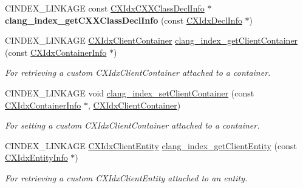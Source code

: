 \begin{DoxyCompactItemize}
C\+I\+N\+D\+E\+X\+\_\+\+L\+I\+N\+K\+A\+GE const \mbox{\hyperlink{structCXIdxCXXClassDeclInfo}{C\+X\+Idx\+C\+X\+X\+Class\+Decl\+Info}} $\ast$ {\bfseries clang\+\_\+index\+\_\+get\+C\+X\+X\+Class\+Decl\+Info} (const \mbox{\hyperlink{structCXIdxDeclInfo}{C\+X\+Idx\+Decl\+Info}} $\ast$)
\item 
\mbox{\label{group__CINDEX__HIGH_gaca430242bc5e6f6faaac3aa39105b5c1}} 
C\+I\+N\+D\+E\+X\+\_\+\+L\+I\+N\+K\+A\+GE \mbox{\hyperlink{group__CINDEX__HIGH_ga0dac2cb977094bbd9d13b9d8abed278f}{C\+X\+Idx\+Client\+Container}} \mbox{\hyperlink{group__CINDEX__HIGH_gaca430242bc5e6f6faaac3aa39105b5c1}{clang\+\_\+index\+\_\+get\+Client\+Container}} (const \mbox{\hyperlink{structCXIdxContainerInfo}{C\+X\+Idx\+Container\+Info}} $\ast$)
\begin{DoxyCompactList}\small\item\em For retrieving a custom C\+X\+Idx\+Client\+Container attached to a container. \end{DoxyCompactList}\item 
\mbox{\label{group__CINDEX__HIGH_ga85255b4017399b012f9967125a3a36e8}} 
C\+I\+N\+D\+E\+X\+\_\+\+L\+I\+N\+K\+A\+GE void \mbox{\hyperlink{group__CINDEX__HIGH_ga85255b4017399b012f9967125a3a36e8}{clang\+\_\+index\+\_\+set\+Client\+Container}} (const \mbox{\hyperlink{structCXIdxContainerInfo}{C\+X\+Idx\+Container\+Info}} $\ast$, \mbox{\hyperlink{group__CINDEX__HIGH_ga0dac2cb977094bbd9d13b9d8abed278f}{C\+X\+Idx\+Client\+Container}})
\begin{DoxyCompactList}\small\item\em For setting a custom C\+X\+Idx\+Client\+Container attached to a container. \end{DoxyCompactList}\item 
\mbox{\label{group__CINDEX__HIGH_ga1731a531a2a24471cef7288623b9820b}} 
C\+I\+N\+D\+E\+X\+\_\+\+L\+I\+N\+K\+A\+GE \mbox{\hyperlink{group__CINDEX__HIGH_gaaa7374e63b63b3d14af7cf87af386955}{C\+X\+Idx\+Client\+Entity}} \mbox{\hyperlink{group__CINDEX__HIGH_ga1731a531a2a24471cef7288623b9820b}{clang\+\_\+index\+\_\+get\+Client\+Entity}} (const \mbox{\hyperlink{structCXIdxEntityInfo}{C\+X\+Idx\+Entity\+Info}} $\ast$)
\begin{DoxyCompactList}\small\item\em For retrieving a custom C\+X\+Idx\+Client\+Entity attached to an entity. \end{DoxyCompactList}\item 

\end{DoxyCompactItemize}
